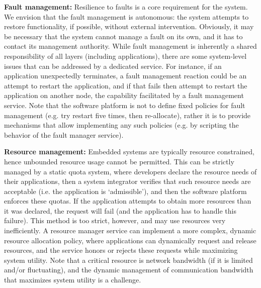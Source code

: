 \textbf{Fault management:} Resilience to faults is a core
  requirement for the system. We envision that the fault management is
  autonomous: the system attempts to restore functionality, if
  possible, without external intervention. Obviously, it may be
  necessary that the system cannot manage a fault on its own, and it
  has to contact its management authority.  While fault management is
  inherently a shared responsibility of all layers (including
  applications), there are some system-level issues that
  can be addressed by a dedicated service. For instance, if an
  application unexpectedly terminates, a fault management reaction
  could be an attempt to restart the application, and if that fails
  then attempt to restart the application on another node, 
  the capability facilitated by a fault management service. Note
  that the software platform is not to define fixed policies for
  fault management (e.g. try restart five times, then re-allocate),
  rather it is to provide mechanisms that allow implementing any such
  policies (e.g. by scripting the behavior of the fault manager
  service).

 \textbf{Resource management:} Embedded systems are typically
  resource constrained, hence unbounded resource usage cannot be
  permitted. This can be strictly managed by a static quota system,
  where developers declare the resource needs of their applications,
  then a system integrator verifies that such resource needs are
  acceptable (i.e. the application is `admissible'), and then the
  software platform enforces these quotas. If the application attempts
  to obtain more resources than it was declared, the request will fail
  (and the application has to handle this failure). This method is too
  strict, however, and may use resources very inefficiently. A
  resource manager service can implement a more complex, dynamic
  resource allocation policy, where applications can dynamically
  request and release resources, and the service honors or rejects
  these requests while maximizing system utility. Note that a critical
  resource is network bandwidth (if it is limited and/or fluctuating),
  and the dynamic management of communication bandwidth that maximizes
  system utility is a challenge.


